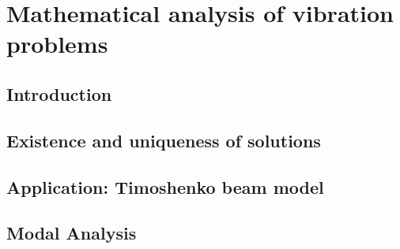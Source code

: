 \documentclass[../../main.tex]{subfiles}
\begin{document}
\chapter{Mathematical analysis of vibration problems}\label{chap:vibration_analysis}
\section{Introduction}\label{sec:introduction_vibration}
\section{Existence and uniqueness of solutions}\label{sec:existence_uniqueness}
\section{Application: Timoshenko beam model}\label{sec:application_timoshenko}
\section{Modal Analysis}\label{sec:modal_analysis}
\end{document}
